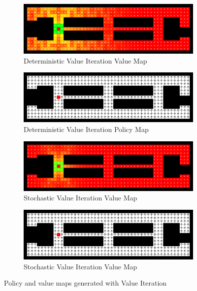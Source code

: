\documentclass{article}
\begin{document}
\begin{figure}
    \begin{subfigure}{.5\textwidth}
        \centering
        \includegraphics[width=.8\linewidth]{imgs/value_iteration_value_map_deterministic.png}
        \caption{Deterministic Value Iteration Value Map}
    \end{subfigure}
    \begin{subfigure}{.5\textwidth}
        \centering
        \includegraphics[width=.8\linewidth]{imgs/value_iteration_policy_map_deterministic.png}
        \caption{Deterministic Value Iteration Policy Map}
    \end{subfigure}
    \begin{subfigure}{.5\textwidth}
        \centering
        \includegraphics[width=.8\linewidth]{imgs/value_iteration_value_map_stochastic.png}
        \caption{Stochastic Value Iteration Value Map}
    \end{subfigure}
    \begin{subfigure}{.5\textwidth}
        \centering
        \includegraphics[width=.8\linewidth]{imgs/value_iteration_policy_map_stochastic.png}
        \caption{Stochastic Value Iteration Value Map}
    \end{subfigure}
    \caption{Policy and value maps generated with Value Iteration}
\end{figure}
\end{document}
